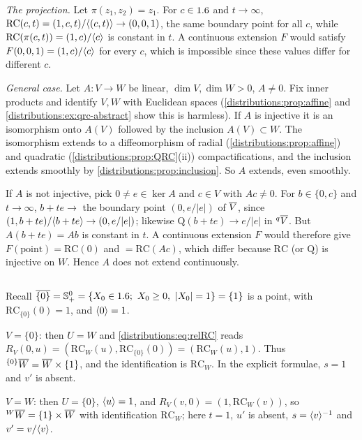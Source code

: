 \emph{The projection.} Let $\pi(z_1,z_2)=z_1$. For $c\in1.6$ and $t\to\infty$,
$\mathrm{RC}(c,t)=(1,c,t)/\langle (c,t)\rangle\to(0,0,1)$, the same boundary point for all $c$,
while $\mathrm{RC}(\pi(c,t))=(1,c)/\langle c\rangle$ is constant in $t$. A continuous extension
$F$ would satisfy $F(0,0,1)=(1,c)/\langle c\rangle$ for every $c$, which is impossible since these
values differ for different $c$.

\emph{General case.} Let $A\colon V\to W$ be linear, $\dim V,\dim W>0$, $A\neq0$. Fix
inner products and identify $V,W$ with Euclidean spaces (\cref{distributions:prop:affine}
and \cref{distributions:ex:qrc-abstract} show this is harmless). If $A$ is injective it
is an isomorphism onto $A(V)$ followed by the inclusion $A(V)\subset W$. The
isomorphism extends to a diffeomorphism of radial (\cref{distributions:prop:affine}) and
quadratic (\cref{distributions:prop:QRC}(ii)) compactifications, and the inclusion
extends smoothly by \cref{distributions:prop:inclusion}. So $A$ extends, even smoothly.

If $A$ is not injective, pick $0\ne e\in\ker A$ and $c\in V$ with $Ac\neq0$. For
$b\in\{0,c\}$ and $t\to\infty$, $b+te\to$ the boundary point $(0,e/|e|)$ of $\overline{V}$, since
$(1,b+te)/\langle b+te\rangle\to(0,e/|e|)$; likewise $\mathrm{Q}(b+te)\to e/|e|$ in ${}^{q}\overline{V}$. But
$A(b+te)=Ab$ is constant in $t$. A continuous extension $F$ would therefore give
$F(\text{point})=\mathrm{RC}(0)$ and $=\mathrm{RC}(Ac)$, which differ because
$\mathrm{RC}$ (or $\mathrm{Q}$) is injective on $W$. Hence $A$ does not extend
continuously.

\subsection*{}
Recall $\RC{\{0\}}=\Sphere^0_+=\{X_0\in\R;\ X_0\ge0,\ |X_0|=1\}=\{1\}$ is a point, with
$\mathrm{RC}_{\{0\}}(0)=1$, and $\langle 0\rangle=1$.

$V=\{0\}$: then $U=W$ and \eqref{distributions:eq:relRC} reads
$R_V(0,u)=(\mathrm{RC}_W(u),\mathrm{RC}_{\{0\}}(0))=(\mathrm{RC}_W(u),1)$. Thus
${}^{\{0\}}\overline{W}=\overline{W}\times\{1\}$, and the identification is $\mathrm{RC}_W$. In the
explicit formulae, $s=1$ and $v'$ is absent.

$V=W$: then $U=\{0\}$, $\langle u\rangle=1$, and $R_V(v,0)=(1,\mathrm{RC}_W(v))$, so
${}^{W}\overline{W}=\{1\}\times\overline{W}$ with identification $\mathrm{RC}_W$; here $t=1$, $u'$ is
absent, $s=\langle v\rangle^{-1}$ and $v'=v/\langle v\rangle$.

